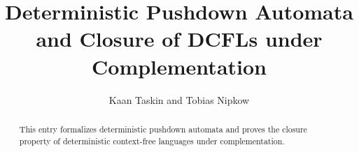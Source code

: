 \documentclass[11pt,a4paper]{article}
\begin{document}
\title{Deterministic Pushdown Automata and Closure of DCFLs under Complementation}
\author{Kaan Taskin and Tobias Nipkow}
\maketitle

\begin{abstract}
This entry formalizes deterministic pushdown automata and proves the closure property of
deterministic context-free languages under complementation.
\end{abstract}

\tableofcontents





\end{document}
